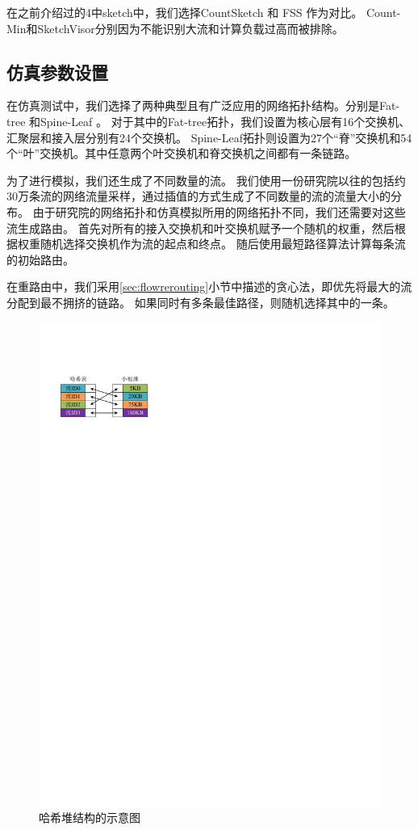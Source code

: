 在之前介绍过的4中sketch中，我们选择CountSketch \cite{charikar2004finding} 和 FSS \cite{homem2010finding}作为对比。
Count-Min\cite{cormode2004improved}和SketchVisor\cite{huang2017sketchvisor}分别因为不能识别大流和计算负载过高而被排除。

\subsection{仿真参数设置}\label{subsec:simulationsetting}

在仿真测试中，我们选择了两种典型且有广泛应用的网络拓扑结构。分别是Fat-tree \cite{al2008scalable}和Spine-Leaf \cite{alizadeh2013data}。
对于其中的Fat-tree拓扑，我们设置为核心层有16个交换机、汇聚层和接入层分别有24个交换机。
Spine-Leaf拓扑则设置为27个“脊”交换机和54个“叶”交换机。其中任意两个叶交换机和脊交换机之间都有一条链路。

为了进行模拟，我们还生成了不同数量的流。
我们使用一份研究院以往的包括约30万条流的网络流量采样，通过插值的方式生成了不同数量的流的流量大小的分布。
由于研究院的网络拓扑和仿真模拟所用的网络拓扑不同，我们还需要对这些流生成路由。
首先对所有的接入交换机和叶交换机赋予一个随机的权重，然后根据权重随机选择交换机作为流的起点和终点。
随后使用最短路径算法计算每条流的初始路由。

在重路由中，我们采用\ref{sec:flowrerouting}小节中描述的贪心法，即优先将最大的流分配到最不拥挤的链路。
如果同时有多条最佳路径，则随机选择其中的一条。

\begin{figure}
    \centering
    \includegraphics[width=0.6\linewidth]{fig/hashheap.pdf}
    \caption{\textnormal{哈希堆结构的示意图}}
	\label{fig:hashheap}
 \end{figure}

